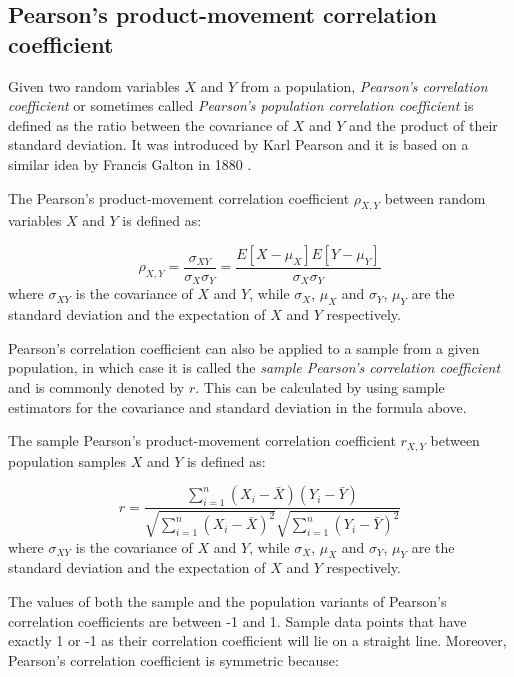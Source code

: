 \subsection{Pearson's product-movement correlation coefficient}

Given two random variables $X$ and $Y$ from a population, \emph{Pearson's
correlation coefficient} or sometimes called \emph{Pearson's population
correlation coefficient} is defined as the ratio between the covariance of $X$
and $Y$ and the product of their standard deviation. It was introduced by Karl
Pearson and it is based on a similar idea by Francis Galton in 1880 \cite{stigler1989francis,lee1988thirteen}.

\begin{mydef}
The Pearson's product-movement correlation coefficient $ \rho_{X,Y} $ between random variables $X$ and $Y$ is defined as:

 $$ \rho_{X,Y} = \frac{\sigma_{XY}}{\sigma_X\sigma_Y} =
\frac{E[X-\mu_X]E[Y-\mu_Y]}{\sigma_X\sigma_Y}$$
where $ \sigma_{XY} $ is the covariance of $X$ and $Y$, while $\sigma_X $, $ \mu_X $ and $\sigma_Y $, $ \mu_Y $ are the standard deviation and the expectation of $X$ and $Y$ respectively.
\end{mydef}


Pearson's correlation coefficient can also be applied to a sample from a given
population, in which case it is called the \emph{sample Pearson's correlation
coefficient} and is commonly denoted by $r$. This can be calculated by using
sample estimators for the covariance and standard deviation in the formula
above. 

\begin{mydef}
The sample Pearson's product-movement correlation coefficient $ r_{X,Y} $ between population samples $X$ and $Y$ is defined as:

\begin{equation}
\label{pears_corr}
 r = \frac{\sum_{i=1}^{n}(X_i - \bar{X})(Y_i -
\bar{Y})}{\sqrt{\sum_{i=1}^{n}\left(X_i -
\bar{X}\right)^2}\sqrt{\sum_{i=1}^{n}\left(Y_i -
\bar{Y}\right)^2}} 
\end{equation}
where $ \sigma_{XY} $ is the covariance of $X$ and $Y$, while $\sigma_X $, $ \mu_X $ and $\sigma_Y $, $ \mu_Y $ are the standard deviation and the expectation of $X$ and $Y$ respectively.
\end{mydef}

The values of both the sample and the population variants of Pearson's
correlation coefficients are between -1 and 1. Sample data points that have 
exactly 1 or -1 as their correlation coefficient will lie on a straight line.
Moreover, Pearson's correlation coefficient is symmetric because: 

